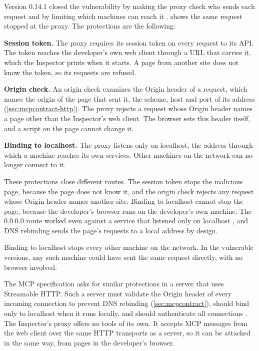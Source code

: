 Version 0.14.1 closed the vulnerability by making the proxy check who sends each request and by
limiting which machines can reach it \citep{mcp-inspector}.  shows the
same request stopped at the proxy. The protections are the following:
\bi
\item \textbf{Session token.} The proxy requires its session token on every request to its API.
The token reaches the developer's own web client through a URL that carries it, which the
Inspector prints when it starts. A page from another site does not know the token, so its requests
are refused.
\item \textbf{Origin check.} An origin check examines the Origin header of a request, which
names the origin of the page that sent it, the scheme, host and port of its address
(\cref{sec:mcpcontract-http}). The proxy rejects a request whose Origin header names a page other
than the Inspector's web client.
The browser sets this header itself, and a script on the page cannot change it.
\item \textbf{Binding to localhost.} The proxy listens only on localhost, the address through which
a machine reaches its own services. Other machines on the network can no longer connect to it.
\ei

These protections close different routes. The session token stops the malicious page, because the
page does not know it, and the origin check rejects any request whose Origin header names another
site. Binding to localhost cannot stop the page, because the developer's browser runs on
the developer's own machine. The 0.0.0.0 route worked even against a service that listened only on
localhost \citep{lumelsky2025inspector}, and DNS rebinding sends the page's requests to a local
address by design.

Binding to localhost stops every other machine on the network. In the vulnerable versions, any such
machine could have sent the same request directly, with no browser involved.

The MCP specification asks for similar protections in a server that uses Streamable HTTP. Such a
server must validate the Origin header of every incoming connection to prevent DNS rebinding
(\cref{sec:mcpcontract}), should bind only to localhost when it runs locally, and should
authenticate all connections \citep{mcp-spec-2026}. The Inspector's proxy offers no tools of its
own. It accepts MCP messages from the web client over the same HTTP transports as a server, so it
can be attacked in the same way, from pages in the developer's browser.


